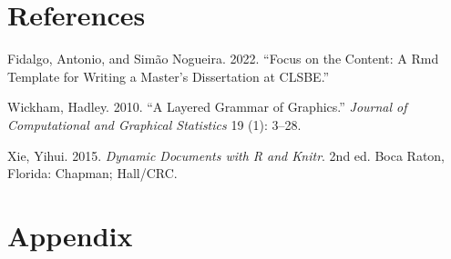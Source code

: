 \documentclass[
  12pt,
]{article}
\newlength{\cslhangindent}
\newlength{\cslentryspacingunit} %
\newenvironment{CSLReferences}[2] %
 {%
  \setlength{\parindent}{0pt}
  \ifodd #1
  \let\oldpar\par
  \def\par{\hangindent=\cslhangindent\oldpar}
  \fi
  \setlength{\parskip}{#2\cslentryspacingunit}
 }%
 {}
\begin{document}
\clearpage

\hypertarget{references}{%
\section*{References}\label{references}}

\hypertarget{refs}{}
\begin{CSLReferences}{1}{0}
\leavevmode{}%
Fidalgo, Antonio, and Simão Nogueira. 2022. {``Focus on the Content: A Rmd Template for Writing a Master's Dissertation at CLSBE.''}

\leavevmode{}%
Wickham, Hadley. 2010. {``A Layered Grammar of Graphics.''} \emph{Journal of Computational and Graphical Statistics} 19 (1): 3--28.

\leavevmode{}%
Xie, Yihui. 2015. \emph{Dynamic Documents with {R} and Knitr}. 2nd ed. Boca Raton, Florida: Chapman; Hall/CRC.

\end{CSLReferences}

\clearpage

\appendix

\hypertarget{appendix}{%
\section{Appendix}\label{appendix}}
\end{document}
